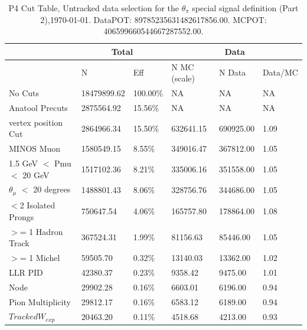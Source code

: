 \begin{table}[!hbt]
    \tiny
    \centering
    \begin{tabular}{|*{6}{l|}}


    \hline
    & \multicolumn{2}{c|}{Total} & \multicolumn{3}{c|}{Data} \\
    \hline
    &  N         & Eff     & N MC (scale) & N Data    & Data/MC \\\hline
    No Cuts   & 18479899.62 & 100.00\% & NA & NA & NA \\ \hline
    Anatool Precuts  & 2875564.92 &  15.56\% & NA & NA & NA  \\ \hline
    vertex position Cut  & 2864966.34     &  15.50\% & 632641.15     & 690925.00 &   1.09 \\ \hline
    MINOS Muon  & 1580549.15     &   8.55\% & 349016.47     & 367812.00 &   1.05 \\ \hline
    1.5 GeV $<$ Pmu $<$ 20 GeV   & 1517102.36     &   8.21\% & 335006.16     & 351558.00 &   1.05 \\ \hline
    $\theta_{\mu}$ $<$ 20 degrees   & 1488801.43     &   8.06\% & 328756.76     & 344686.00 &   1.05 \\ \hline
    $<$2 Isolated Prongs   & 750647.54     &   4.06\% & 165757.80     & 178864.00 &   1.08 \\ \hline
    $>$= 1 Hadron Track   & 367524.31     &   1.99\% & 81156.63     & 85446.00 &   1.05 \\ \hline
    $>$= 1 Michel  & 59505.70     &   0.32\% & 13140.03     & 13362.00 &   1.02 \\ \hline
    LLR PID   & 42380.37     &   0.23\% & 9358.42     & 9475.00 &   1.01 \\ \hline
    Node   & 29902.28     &   0.16\% & 6603.01     & 6196.00 &   0.94 \\ \hline
    Pion Multiplicity   & 29812.17     &   0.16\% & 6583.12     & 6189.00 &   0.94 \\ \hline
    $Tracked W_{exp}$   & 20463.20     &   0.11\% & 4518.68     & 4213.00 &   0.93 \\ \hline
    \end{tabular}
    \caption{P4 Cut Table, Untracked data selection for the $\theta_\pi$ special signal definition (Part 2),\today. DataPOT: 89785235631482617856.00. MCPOT: 406599660544667287552.00.}
    \label{tab:Analysis:Cuts:TrackedCutTableThetapi2}
\end{table}


